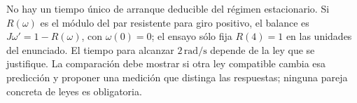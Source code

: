 No hay un tiempo único de arranque deducible del régimen estacionario. Si \(R(\omega)\) es el módulo del par resistente para giro positivo, el balance es \(J\omega'=1-R(\omega)\), con \(\omega(0)=0\); el ensayo sólo fija \(R(4)=1\) en las unidades del enunciado. El tiempo para alcanzar \(2\,\mathrm{rad/s}\) depende de la ley que se justifique. La comparación debe mostrar si otra ley compatible cambia esa predicción y proponer una medición que distinga las respuestas; ninguna pareja concreta de leyes es obligatoria.
